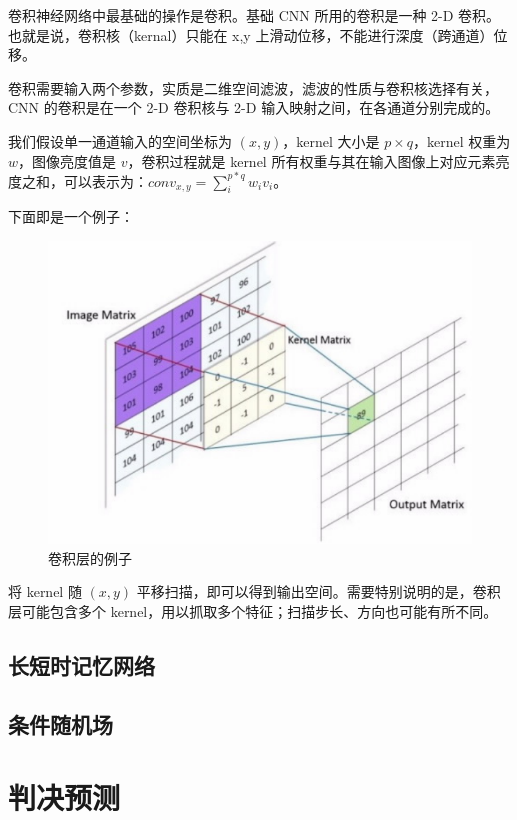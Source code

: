 卷积神经网络中最基础的操作是卷积。基础 CNN 所用的卷积是一种 2-D 卷积。也就是说，卷积核（kernal）只能在 x,y 上滑动位移，不能进行深度（跨通道）位移。

卷积需要输入两个参数，实质是二维空间滤波，滤波的性质与卷积核选择有关，CNN 的卷积是在一个 2-D 卷积核与 2-D 输入映射之间，在各通道分别完成的。

我们假设单一通道输入的空间坐标为 ${\displaystyle (x,y)}$，kernel 大小是 ${\displaystyle p \times q}$，kernel 权重为 ${\displaystyle w}$，图像亮度值是 ${\displaystyle v}$，卷积过程就是 kernel 所有权重与其在输入图像上对应元素亮度之和，可以表示为：${\displaystyle conv_{x,y} = \sum_i^{p*q}w_i v_i}$。

下面即是一个例子：

\begin{figure}[ht]
    \centering
    \includegraphics[width=\linewidth]{figures/cnn_conv}
    \caption{卷积层的例子}
    \label{fig:cnn_conv}
\end{figure}

将 kernel 随 ${\displaystyle (x,y)}$ 平移扫描，即可以得到输出空间。需要特别说明的是，卷积层可能包含多个 kernel，用以抓取多个特征；扫描步长、方向也可能有所不同。

\subsection{长短时记忆网络}

\subsection{条件随机场}


\section{判决预测}

